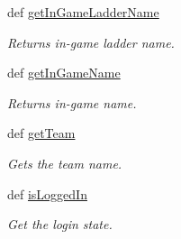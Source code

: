 \begin{DoxyCompactItemize}
def \hyperlink{class_player_1_1_player_a8d4e97427e2c8574abf4245a43d95927}{get\-In\-Game\-Ladder\-Name}
\begin{DoxyCompactList}\small\item\em \-Returns in-\/game ladder name. \end{DoxyCompactList}\item 
def \hyperlink{class_player_1_1_player_ae9d9b71fb07c07cd23cea1a1697ea81c}{get\-In\-Game\-Name}
\begin{DoxyCompactList}\small\item\em \-Returns in-\/game name. \end{DoxyCompactList}\item 
def \hyperlink{class_player_1_1_player_a6bd43ab699ef0d28de7eb3f11a687dea}{get\-Team}
\begin{DoxyCompactList}\small\item\em \-Gets the team name. \end{DoxyCompactList}\item 
def \hyperlink{class_player_1_1_player_adfc0f7871512deecb90334aeaaa71fa9}{is\-Logged\-In}
\begin{DoxyCompactList}\small\item\em \-Get the login state. \end{DoxyCompactList}\end{DoxyCompactItemize}
